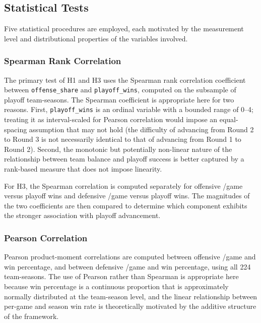 \subsection{Statistical Tests}
\label{sec:stat-tests}

Five statistical procedures are employed, each motivated by the measurement
level and distributional properties of the variables involved.

\subsubsection{Spearman Rank Correlation}
\label{sec:spearman}

The primary test of H1 and H3 uses the Spearman rank correlation coefficient
between \texttt{offense\_share} and \texttt{playoff\_wins}, computed on the
subsample of playoff team-seasons. The Spearman coefficient is appropriate here
for two reasons. First, \texttt{playoff\_wins} is an ordinal variable with a
bounded range of 0--4; treating it as interval-scaled for Pearson correlation
would impose an equal-spacing assumption that may not hold
(the difficulty of advancing from Round 2 to Round 3 is not necessarily
identical to that of advancing from Round 1 to Round 2). Second, the
monotonic but potentially non-linear nature of the relationship between team
balance and playoff success is better captured by a rank-based measure that
does not impose linearity.

For H3, the Spearman correlation is computed separately for offensive
\xvoa{}/game versus playoff wins and defensive \xvoa{}/game versus playoff
wins. The magnitudes of the two coefficients are then compared to determine
which component exhibits the stronger association with playoff advancement.

\subsubsection{Pearson Correlation}

Pearson product-moment correlations are computed between offensive
\xvoa{}/game and win percentage, and between defensive \xvoa{}/game and win
percentage, using all 224 team-seasons. The use of Pearson rather than
Spearman is appropriate here because win percentage is a continuous
proportion that is approximately normally distributed at the team-season
level, and the linear relationship between per-game \xvoa{} and season win
rate is theoretically motivated by the additive structure of the \gds{}
framework.

